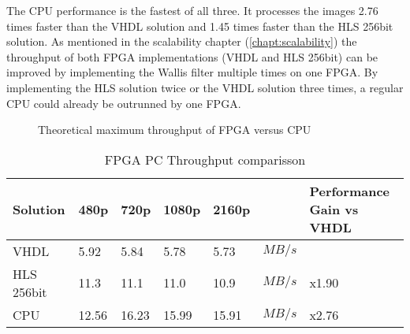 The CPU performance is the fastest of all three. It processes the images 2.76
times faster than the VHDL solution and 1.45 times faster than the HLS 256bit
solution. As mentioned in the scalability chapter (\ref{chapt:scalability}) the
throughput of both FPGA implementations (VHDL and HLS 256bit) can be improved by
implementing the Wallis filter multiple times on one FPGA. By implementing the
HLS solution twice or the VHDL solution three times, a regular CPU could already
be outrunned by one FPGA.

\begin{figure}[b!]
    \centering
    \begin{adjustbox}{max width=\linewidth}
        
    \end{adjustbox}
    \caption{Theoretical maximum throughput of FPGA versus CPU}
    \label{fig:theoreticalmax}
\end{figure}

\begin{table}[b!]
    \centering
    \begin{tabular}{l l l l l l l}
        \toprule
        Solution & 480p & 720p & 1080p & 2160p & & Performance Gain vs VHDL\\
        \midrule
        VHDL       & 5.92  & 5.84  & 5.78  & 5.73  & $MB/s$ & \\
        HLS 256bit & 11.3  & 11.1  & 11.0  & 10.9  & $MB/s$ & x1.90\\
        CPU        & 12.56 & 16.23 & 15.99 & 15.91 & $MB/s$ & x2.76\\
        \bottomrule
    \end{tabular}
    \caption{FPGA PC Throughput comparisson}
    \label{tab:throughputcompare}
\end{table}



